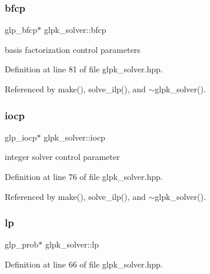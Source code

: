 \subsubsection{\texorpdfstring{bfcp}{bfcp}}
{\footnotesize\ttfamily glp\+\_\+bfcp$\ast$ glpk\+\_\+solver\+::bfcp\hspace{0.3cm}{\ttfamily [private]}}



basis factorization control parameters 



Definition at line 81 of file glpk\+\_\+solver.\+hpp.



Referenced by make(), solve\+\_\+ilp(), and $\sim$glpk\+\_\+solver().

\mbox{\label{classglpk__solver_af5bd398e598ed681c555fabb31b5ca67}} 
\subsubsection{\texorpdfstring{iocp}{iocp}}
{\footnotesize\ttfamily glp\+\_\+iocp$\ast$ glpk\+\_\+solver\+::iocp\hspace{0.3cm}{\ttfamily [private]}}



integer solver control parameter 



Definition at line 76 of file glpk\+\_\+solver.\+hpp.



Referenced by make(), solve\+\_\+ilp(), and $\sim$glpk\+\_\+solver().

\mbox{\label{classglpk__solver_a2e88b7bd295decf6688a99db14cc0190}} 
\subsubsection{\texorpdfstring{lp}{lp}}
{\footnotesize\ttfamily glp\+\_\+prob$\ast$ glpk\+\_\+solver\+::lp\hspace{0.3cm}{\ttfamily [private]}}



Definition at line 66 of file glpk\+\_\+solver.\+hpp.




